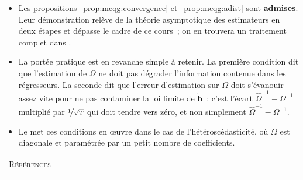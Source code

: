 \documentclass[10pt]{beamer}
\begin{document}
\begin{notes}

  \begin{itemize}

  \item Les propositions~\ref{prop:mcqg:convergence} et~\ref{prop:mcqg:adist} sont
    \textbf{admises}. Leur démonstration relève de la théorie asymptotique des
    estimateurs en deux étapes et dépasse le cadre de ce cours~; on en trouvera un
    traitement complet dans \cite{Greene2017}.\newline

  \item La portée pratique est en revanche simple à retenir. La première condition dit
    que l'estimation de $\Omega$ ne doit pas dégrader l'information contenue dans les
    régresseurs. La seconde dit que l'erreur d'estimation sur $\Omega$ doit s'évanouir
    assez vite pour ne pas contaminer la loi limite de $\breve{\mathbf b}$~: c'est
    l'écart $\widehat\Omega^{-1}-\Omega^{-1}$ multiplié par $\nicefrac{1}{\sqrt T}$ qui
    doit tendre vers zéro, et non simplement $\widehat\Omega^{-1}-\Omega^{-1}$.\newline

  \item Le  met ces conditions en \oe uvre dans le cas de
    l'hétéroscédasticité, où $\Omega$ est diagonale et paramétrée par un petit nombre
    de coefficients.

  \end{itemize}

\end{notes}




\begin{notes}

  \begin{center}
    \begin{tabular}{c}
      \\
      \Huge{\textsc{Références}}\\
      \\
    \end{tabular}
  \end{center}

  \bigskip

  \nocite{Greene2017}

  \nocite{Schmidt1976}

  \printbibliography

\end{notes}
\end{document}
